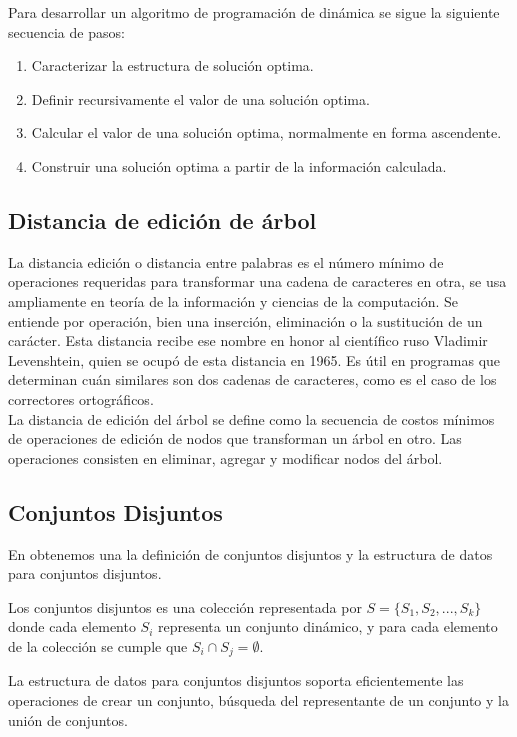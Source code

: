 \noindent Para desarrollar un algoritmo de programación de dinámica se sigue la siguiente secuencia de pasos:
\begin{enumerate}
    \item Caracterizar la estructura de solución optima.
    \item Definir recursivamente el valor de una solución optima.
    \item Calcular el valor de una solución optima, normalmente en forma ascendente.
    \item Construir una solución optima a partir de la información calculada.
\end{enumerate}

\subsection{Distancia de edición de árbol}
La distancia edición o distancia entre palabras es el número mínimo de operaciones requeridas para transformar una cadena de caracteres en otra, se usa ampliamente en teoría de la información y ciencias de la computación. Se entiende por operación, bien una inserción, eliminación o la sustitución de un carácter. Esta distancia recibe ese nombre en honor al científico ruso Vladimir Levenshtein, quien se ocupó de esta distancia en 1965. Es útil en programas que determinan cuán similares son dos cadenas de caracteres, como es el caso de los correctores ortográficos.\\

La distancia de edición del árbol se define como la secuencia de costos mínimos de operaciones de edición de nodos que transforman un árbol en otro. Las operaciones consisten en eliminar, agregar y modificar nodos del árbol.

\subsection{Conjuntos Disjuntos}
En \cite{Cormen2009} obtenemos una la definición de conjuntos disjuntos y la estructura de datos para conjuntos disjuntos.

Los conjuntos disjuntos es una colección representada por $S=\{ S_1,S_2,...,S_k \}$ donde cada elemento $S_i$ representa un conjunto dinámico, y para cada elemento de la colección se cumple que $S_i \cap S_j = \emptyset$.

La estructura de datos para conjuntos disjuntos soporta eficientemente las operaciones de crear un conjunto, búsqueda del representante de un conjunto y la unión de conjuntos.

